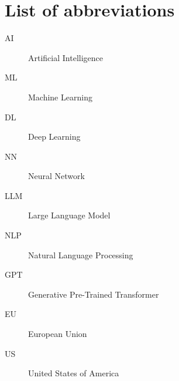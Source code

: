 \chapter*{List of abbreviations}


\begin{description}
    \item[AI] Artificial Intelligence
\end{description}

\begin{description}
    \item[ML] Machine Learning
\end{description}

\begin{description}
    \item[DL] Deep Learning
\end{description}

\begin{description}
    \item[NN] Neural Network 
\end{description}

\begin{description}
    \item[LLM] Large Language Model
\end{description}

\begin{description}
    \item[NLP] Natural Language Processing
\end{description}

\begin{description}
    \item[GPT] Generative Pre-Trained Transformer
\end{description}

\begin{description}
    \item[EU] European Union 
\end{description}

\begin{description}
    \item[US] United States of America
\end{description}